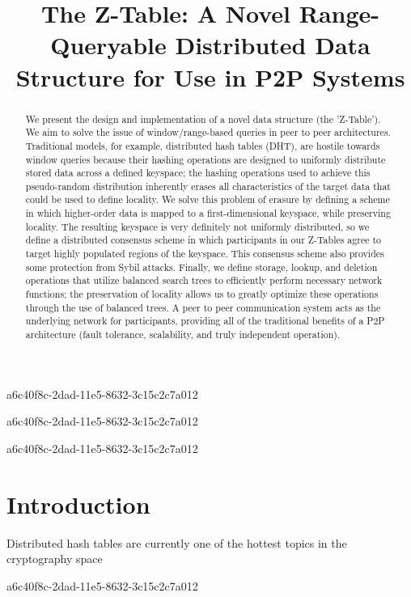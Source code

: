 \documentclass[12pt]{article}
\title{The Z-Table: A Novel Range-Queryable Distributed Data Structure for Use in P2P Systems}
\begin{document}
a6c40f8c-2dad-11e5-8632-3c15c2c7a012\maketitle

a6c40f8c-2dad-11e5-8632-3c15c2c7a012\begin{abstract}
We present the design and implementation of a novel data structure (the 'Z-Table'). We aim to solve the issue of window/range-based queries in peer to peer architectures. Traditional models, for example,  distributed hash tables (DHT), are hostile towards window queries because their hashing operations are designed to uniformly distribute stored data across a defined keyspace; the hashing operations used to achieve this pseudo-random distribution inherently erases all characteristics of the target data that could be used to define locality. We solve this problem of erasure by defining a scheme in which higher-order data is mapped to a first-dimensional keyspace, while preserving locality. The resulting keyspace is very definitely not uniformly distributed, so we define a distributed consensus scheme in which participants in our Z-Tables agree to target highly populated regions of the keyspace. This consensus scheme also provides some protection from Sybil attacks. Finally, we define storage, lookup, and deletion operations that utilize balanced search trees to efficiently perform necessary network functions; the preservation of locality allows us to greatly optimize these operations through the use of balanced trees. A peer to peer communication system acts as the underlying network for participants, providing all of the traditional benefits of a P2P architecture (fault tolerance, scalability, and truly independent operation).
\end{abstract}

a6c40f8c-2dad-11e5-8632-3c15c2c7a012
\newpage
\section{Introduction}
Distributed hash tables are currently one of the hottest topics in the cryptography space~\cite{Stoica:2001dj,Rowstron:2001ea,Ratnasamy:2001wn}

a6c40f8c-2dad-11e5-8632-3c15c2c7a012\printbibliography
\end{document}
